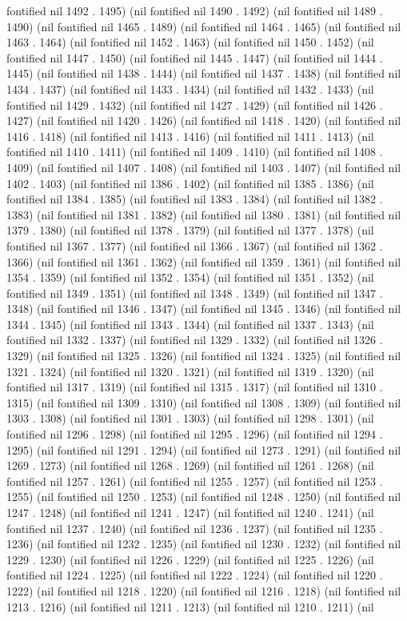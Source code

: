 fontified nil 1492 . 1495) (nil fontified nil 1490 . 1492) (nil fontified nil 1489 . 1490) (nil fontified nil 1465 . 1489) (nil fontified nil 1464 . 1465) (nil fontified nil 1463 . 1464) (nil fontified nil 1452 . 1463) (nil fontified nil 1450 . 1452) (nil fontified nil 1447 . 1450) (nil fontified nil 1445 . 1447) (nil fontified nil 1444 . 1445) (nil fontified nil 1438 . 1444) (nil fontified nil 1437 . 1438) (nil fontified nil 1434 . 1437) (nil fontified nil 1433 . 1434) (nil fontified nil 1432 . 1433) (nil fontified nil 1429 . 1432) (nil fontified nil 1427 . 1429) (nil fontified nil 1426 . 1427) (nil fontified nil 1420 . 1426) (nil fontified nil 1418 . 1420) (nil fontified nil 1416 . 1418) (nil fontified nil 1413 . 1416) (nil fontified nil 1411 . 1413) (nil fontified nil 1410 . 1411) (nil fontified nil 1409 . 1410) (nil fontified nil 1408 . 1409) (nil fontified nil 1407 . 1408) (nil fontified nil 1403 . 1407) (nil fontified nil 1402 . 1403) (nil fontified nil 1386 . 1402) (nil fontified nil 1385 . 1386) (nil fontified nil 1384 . 1385) (nil fontified nil 1383 . 1384) (nil fontified nil 1382 . 1383) (nil fontified nil 1381 . 1382) (nil fontified nil 1380 . 1381) (nil fontified nil 1379 . 1380) (nil fontified nil 1378 . 1379) (nil fontified nil 1377 . 1378) (nil fontified nil 1367 . 1377) (nil fontified nil 1366 . 1367) (nil fontified nil 1362 . 1366) (nil fontified nil 1361 . 1362) (nil fontified nil 1359 . 1361) (nil fontified nil 1354 . 1359) (nil fontified nil 1352 . 1354) (nil fontified nil 1351 . 1352) (nil fontified nil 1349 . 1351) (nil fontified nil 1348 . 1349) (nil fontified nil 1347 . 1348) (nil fontified nil 1346 . 1347) (nil fontified nil 1345 . 1346) (nil fontified nil 1344 . 1345) (nil fontified nil 1343 . 1344) (nil fontified nil 1337 . 1343) (nil fontified nil 1332 . 1337) (nil fontified nil 1329 . 1332) (nil fontified nil 1326 . 1329) (nil fontified nil 1325 . 1326) (nil fontified nil 1324 . 1325) (nil fontified nil 1321 . 1324) (nil fontified nil 1320 . 1321) (nil fontified nil 1319 . 1320) (nil fontified nil 1317 . 1319) (nil fontified nil 1315 . 1317) (nil fontified nil 1310 . 1315) (nil fontified nil 1309 . 1310) (nil fontified nil 1308 . 1309) (nil fontified nil 1303 . 1308) (nil fontified nil 1301 . 1303) (nil fontified nil 1298 . 1301) (nil fontified nil 1296 . 1298) (nil fontified nil 1295 . 1296) (nil fontified nil 1294 . 1295) (nil fontified nil 1291 . 1294) (nil fontified nil 1273 . 1291) (nil fontified nil 1269 . 1273) (nil fontified nil 1268 . 1269) (nil fontified nil 1261 . 1268) (nil fontified nil 1257 . 1261) (nil fontified nil 1255 . 1257) (nil fontified nil 1253 . 1255) (nil fontified nil 1250 . 1253) (nil fontified nil 1248 . 1250) (nil fontified nil 1247 . 1248) (nil fontified nil 1241 . 1247) (nil fontified nil 1240 . 1241) (nil fontified nil 1237 . 1240) (nil fontified nil 1236 . 1237) (nil fontified nil 1235 . 1236) (nil fontified nil 1232 . 1235) (nil fontified nil 1230 . 1232) (nil fontified nil 1229 . 1230) (nil fontified nil 1226 . 1229) (nil fontified nil 1225 . 1226) (nil fontified nil 1224 . 1225) (nil fontified nil 1222 . 1224) (nil fontified nil 1220 . 1222) (nil fontified nil 1218 . 1220) (nil fontified nil 1216 . 1218) (nil fontified nil 1213 . 1216) (nil fontified nil 1211 . 1213) (nil fontified nil 1210 . 1211) (nil 